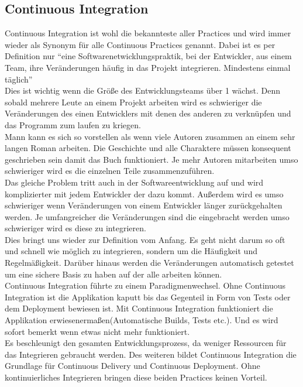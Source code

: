 \subsection{Continuous Integration}
Continuous Integration ist wohl die bekannteste aller Practices und wird immer wieder als Synonym für alle Continuous Practices genannt.\autocite[Vgl.][S.12]{Stahl.2018} Dabei ist es per Definition nur \enquote{eine Softwarenetwicklungspraktik, bei der Entwickler, aus einem Team, ihre Veränderungen häufig in das Projekt integrieren. Mindestens einmal täglich}\autocite[S.12]{Stahl.2018}\\
Dies ist wichtig wenn die Größe des Entwicklungsteams über 1 wächst. Denn sobald mehrere Leute an einem Projekt arbeiten wird es schwieriger die Veränderungen des einen Entwicklers mit denen des anderen zu verknüpfen und das Programm zum laufen zu kriegen.\autocite[Vgl.][S.4]{Stahl.2018}\\ Mann kann es sich so vorstellen als wenn viele Autoren zusammen an einem sehr langen Roman arbeiten. Die Geschichte und alle Charaktere müssen konsequent geschrieben sein damit das Buch funktioniert. Je mehr Autoren mitarbeiten umso schwieriger wird es die einzelnen Teile zusammenzuführen.\\ Das gleiche Problem tritt auch in der Softwareentwicklung auf und wird komplizierter mit jedem Entwickler der dazu kommt. Außerdem wird es umso schwieriger wenn Veränderungen von einem Entwickler länger zurückgehalten werden. Je umfangreicher die Veränderungen sind die eingebracht werden umso schwieriger wird es diese zu integrieren.\\ Dies bringt uns wieder zur Definition vom Anfang. Es geht nicht darum so oft und schnell wie möglich zu integrieren, sondern um die Häufigkeit und Regelmäßigkeit.\autocite[Vgl.][S.3]{Stahl.2018} Darüber hinaus werden die Veränderungen automatisch getestet um eine sichere Basis zu haben auf der alle arbeiten können.\\ Continuous Integration führte zu einem Paradigmenwechsel. Ohne Continuous Integration ist die Applikation kaputt bis das Gegenteil in Form von Tests oder dem Deployment bewiesen ist. Mit Continuous Integration funktioniert die Applikation erwiesenermaßen(Automatische Builds, Tests etc.). Und es wird sofort bemerkt wenn etwas nicht mehr funktioniert.\autocite[Vgl.][S.40]{Farley.2010}\\ Es beschleunigt den gesamten Entwicklungsprozess, da weniger Ressourcen für das Integrieren gebraucht werden. Des weiteren bildet Continuous Integration die Grundlage für Continuous Delivery und Continuous Deployment. Ohne kontinuierliches Integrieren bringen diese beiden Practices keinen Vorteil.
